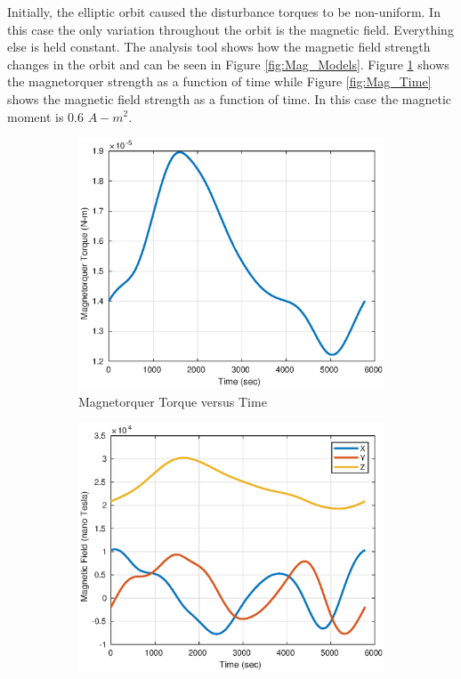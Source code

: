 \documentclass[conf]{new-aiaa}
\begin{document}
Initially, the elliptic orbit caused the disturbance torques to be non-uniform. In this case the only variation throughout the orbit is the magnetic field. Everything else is held constant. The analysis tool shows how the magnetic field strength changes in the orbit and can be seen in Figure \ref{fig:Mag_Models}. Figure \ref{fig:Mag_Alt} shows the magnetorquer strength as a function of time while Figure \ref{fig:Mag_Time} shows the magnetic field strength as a function of time. In this case the magnetic moment is 0.6 $A-m^2$. 

\begin{figure}[H]
     \centering
     \begin{subfigure}[b]{0.45\textwidth}
         \centering
         \includegraphics[width=\textwidth]{Figures/MagTorque.eps}
         \caption{Magnetorquer Torque versus Time}
         \label{fig:Mag_Alt}
     \end{subfigure}
     \hfill
     \begin{subfigure}[b]{0.45\textwidth}
         \centering
         \includegraphics[width=\textwidth]{Figures/MagField.eps}

\end{subfigure}
\end{figure}
\end{document}
